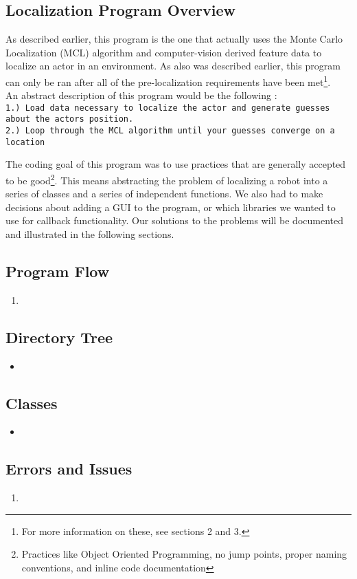 \documentclass[a4paper,11pt]{article}
\begin{document}
  \subsection{Localization Program Overview}
  As described earlier, this program is the one that actually uses the Monte Carlo Localization (MCL) algorithm and computer-vision derived feature data to localize an actor in an environment.
  As also was described earlier, this program can only be ran after all of the pre-localization requirements have been met\footnote{For more information on these, see sections 2 and 3.}.
  \\ An abstract description of this program would be the following :
  \\ \texttt{1.) Load data necessary to localize the actor and generate guesses about the actors position.} 
  \\ \texttt{2.) Loop through the MCL algorithm until your guesses converge on a location}

  The coding goal of this program was to use practices that are generally accepted to be good\footnote{Practices like Object Oriented Programming, no jump points, proper naming conventions, and inline code documentation}.
  This means abstracting the problem of localizing a robot into a series of classes and a series of independent functions. We also had to make decisions about adding a GUI
  to the program, or which libraries we wanted to use for callback functionality. Our solutions to the problems will be documented and illustrated in the following sections.
  
  \subsection{Program Flow}
  \begin{enumerate}
   \item
  \end{enumerate}


  \subsection{Directory Tree}
  \begin{itemize}
   \item 
  \end{itemize}

  
  
  \subsection{Classes}
  \begin{itemize}
   \item 
  \end{itemize}

  
  
  \subsection{Errors and Issues}
  \begin{enumerate}
   \item 
  \end{enumerate}

  
  
  


  

  
\end{document}
